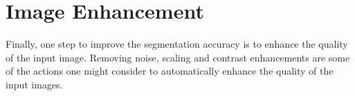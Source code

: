\section{Image Enhancement}\label{sec:image-enhancement}
Finally, one step to improve the segmentation accuracy is to enhance the
quality of the input image. Removing noise, scaling and contrast enhancements
are some of the actions one might consider to automatically enhance the quality
of the input images.
